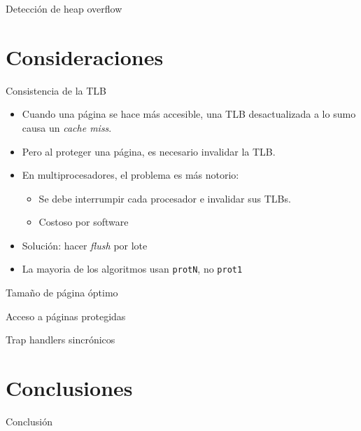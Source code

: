\documentclass[xcolor=pdftex,dvipsnames,usenames,table]{beamer}
\begin{document}
\begin{frame}{Detección de heap overflow}
\end{frame}

\section{Consideraciones}

\begin{frame}{Consistencia de la TLB}
  \begin{itemize}
    \item Cuando una página se hace más accesible, una TLB desactualizada a lo
          sumo causa un \textit{cache miss}.
    \item Pero al proteger una página, es necesario invalidar la TLB.
    \item En multiprocesadores, el problema es más notorio:
    \begin{itemize}
      \item Se debe interrumpir cada procesador e invalidar sus TLBs.
      \item Costoso por software
    \end{itemize}
    \item Solución: hacer \textit{flush} por lote
    \item La mayoria de los algoritmos usan \texttt{protN}, no \texttt{prot1}
  \end{itemize}
\end{frame}

\begin{frame}{Tamaño de página óptimo}
\end{frame}

\begin{frame}{Acceso a páginas protegidas}
\end{frame}

\begin{frame}{Trap handlers sincrónicos}
\end{frame}

\section{Conclusiones}

\begin{frame}{Conclusión}
\end{frame}
\end{document}
